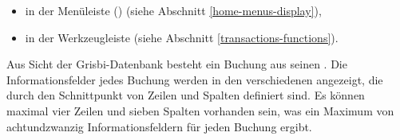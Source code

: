 \begin{itemize}
		\begin{itemize}
			\item in der Menüleiste  () (siehe Abschnitt \vref{home-menus-display}),
			\item in der Werkzeugleiste  (siehe Abschnitt \vref{transactions-functions}).
		\end{itemize}
\end{itemize}

Aus Sicht der Grisbi-Datenbank besteht ein Buchung aus seinen . Die Informationsfelder jedes Buchung werden in den verschiedenen  angezeigt, die durch den Schnittpunkt von Zeilen und Spalten definiert sind. Es können maximal vier Zeilen und sieben Spalten vorhanden sein, was ein Maximum von achtundzwanzig Informationsfeldern für jeden Buchung ergibt.

